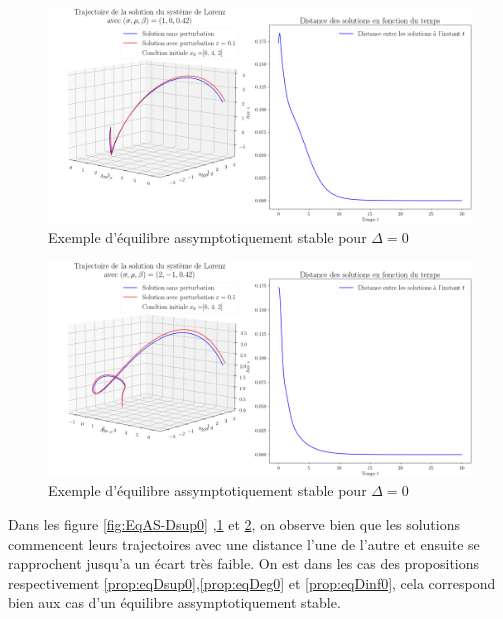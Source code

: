 \documentclass{article}
\newtheorem[M , nocut]{prop}{Proposition}[section]
\newtheorem[M , nocut]{definition}{Définition}
\newtheorem[M , nocut]{lemme}{Lemme}
\newtheorem[L , nocut]{thm}{Théoreme}
\newtheorem[M , nocut]{cor}{Corollaire}
\begin{document}
\begin{figure}[!ht]
    \label{fig:EqAS-Deg0}
    \centering
    \includegraphics[width = \textwidth]{EqAS-Deg0}
    \caption{Exemple d'équilibre assymptotiquement stable pour $\Delta=0$}
\end{figure}

\begin{figure}[!ht]
    \label{fig:eqAS-Dinf0}
    \centering
    \includegraphics[width = \textwidth]{EqAS-Dinf0}
    \caption{Exemple d'équilibre assymptotiquement stable pour $\Delta=0$}
\end{figure}
Dans les figure \ref{fig:EqAS-Dsup0} ,\ref{fig:EqAS-Deg0} et \ref{fig:eqAS-Dinf0}, on observe bien que les solutions commencent leurs trajectoires avec une distance l'une de l'autre et ensuite se rapprochent jusqu'a un écart très faible. On est dans les cas des propositions respectivement \ref{prop:eqDsup0},\ref{prop:eqDeg0} et \ref{prop:eqDinf0}, cela correspond bien aux cas d'un équilibre assymptotiquement stable.
\end{document}
